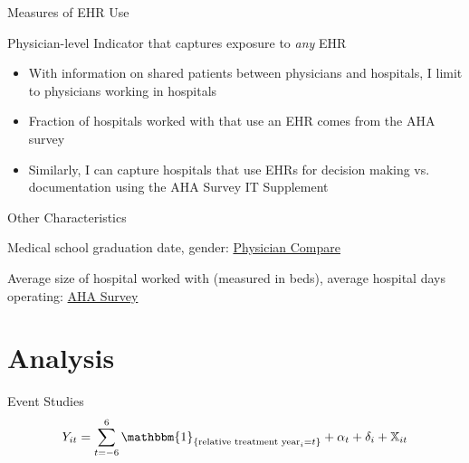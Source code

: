 \documentclass[10pt]{beamer}
\begin{document}
\begin{frame}{Measures of EHR Use}

Physician-level Indicator that captures exposure to \textit{any} EHR
\begin{itemize}
    \item With information on shared patients between physicians and hospitals, I limit to physicians working in hospitals
    \item Fraction of hospitals worked with that use an EHR comes from the AHA survey
    \item Similarly, I can capture hospitals that use EHRs for decision making vs. documentation using the AHA Survey IT Supplement 
\end{itemize}


\end{frame}

\begin{frame}{Other Characteristics}

Medical school graduation date, gender: \underline{Physician Compare}

\vspace{5mm}

Average size of hospital worked with (measured in beds), average hospital days operating: \underline{AHA Survey}
\end{frame}

\section{Analysis}

\begin{frame}{Event Studies}
\begin{equation*}
    Y_{it}= \sum_{t=-6}^6 \mathbbm{1}_{\{\text{relative treatment year}_{i}=t\}} + \alpha_t + \delta_{i} + \mathbb{X}_{it}
\end{equation*}
    
\end{frame}
\end{document}
